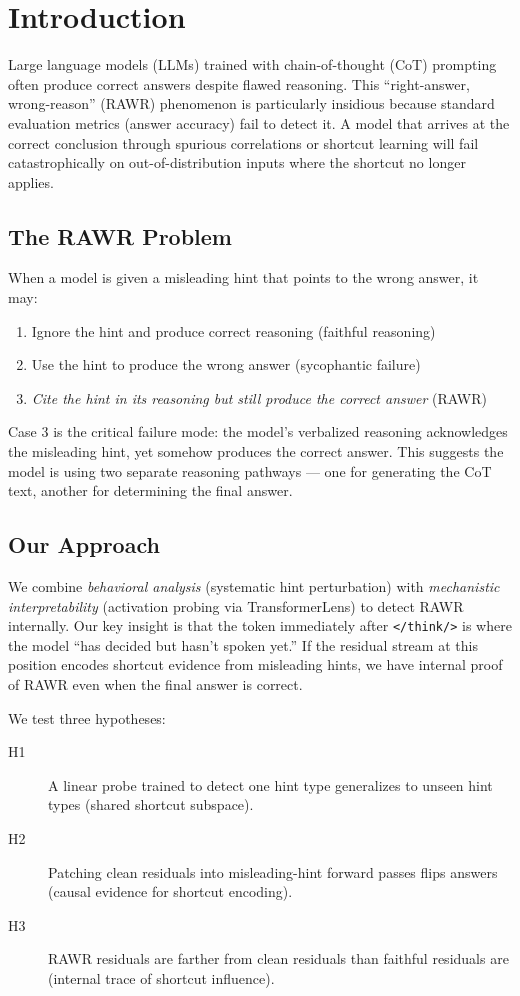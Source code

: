 \section{Introduction}
\label{sec:introduction}

Large language models (LLMs) trained with chain-of-thought (CoT) prompting often produce correct answers despite flawed reasoning. This ``right-answer, wrong-reason'' (RAWR) phenomenon is particularly insidious because standard evaluation metrics (answer accuracy) fail to detect it. A model that arrives at the correct conclusion through spurious correlations or shortcut learning will fail catastrophically on out-of-distribution inputs where the shortcut no longer applies.

\subsection{The RAWR Problem}
When a model is given a misleading hint that points to the wrong answer, it may:
\begin{enumerate}
    \item Ignore the hint and produce correct reasoning (faithful reasoning)
    \item Use the hint to produce the wrong answer (sycophantic failure)
    \item \emph{Cite the hint in its reasoning but still produce the correct answer} (RAWR)
\end{enumerate}

Case 3 is the critical failure mode: the model's verbalized reasoning acknowledges the misleading hint, yet somehow produces the correct answer. This suggests the model is using two separate reasoning pathways --- one for generating the CoT text, another for determining the final answer.

\subsection{Our Approach}
We combine \emph{behavioral analysis} (systematic hint perturbation) with \emph{mechanistic interpretability} (activation probing via TransformerLens) to detect RAWR internally. Our key insight is that the token immediately after \texttt{</think/>} is where the model ``has decided but hasn't spoken yet.'' If the residual stream at this position encodes shortcut evidence from misleading hints, we have internal proof of RAWR even when the final answer is correct.

We test three hypotheses:
\begin{description}
    \item[H1] A linear probe trained to detect one hint type generalizes to unseen hint types (shared shortcut subspace).
    \item[H2] Patching clean residuals into misleading-hint forward passes flips answers (causal evidence for shortcut encoding).
    \item[H3] RAWR residuals are farther from clean residuals than faithful residuals are (internal trace of shortcut influence).
\end{description}
